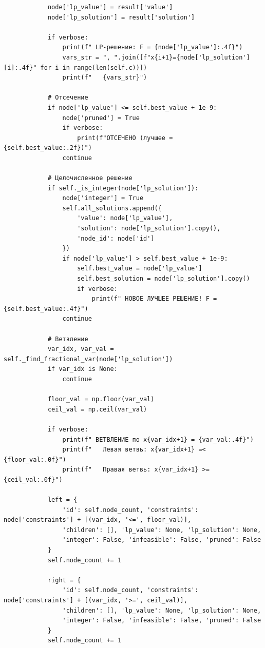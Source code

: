 \documentclass[oneside,a4paper,14pt]{extarticle}
\begin{document}
\begin{verbatim}
            node['lp_value'] = result['value']
            node['lp_solution'] = result['solution']

            if verbose:
                print(f" LP-решение: F = {node['lp_value']:.4f}")
                vars_str = ", ".join([f"x{i+1}={node['lp_solution'][i]:.4f}" for i in range(len(self.c))])
                print(f"   {vars_str}")

            # Отсечение
            if node['lp_value'] <= self.best_value + 1e-9:
                node['pruned'] = True
                if verbose:
                    print(f"ОТСЕЧЕНО (лучшее = {self.best_value:.2f})")
                continue

            # Целочисленное решение
            if self._is_integer(node['lp_solution']):
                node['integer'] = True
                self.all_solutions.append({
                    'value': node['lp_value'],
                    'solution': node['lp_solution'].copy(),
                    'node_id': node['id']
                })
                if node['lp_value'] > self.best_value + 1e-9:
                    self.best_value = node['lp_value']
                    self.best_solution = node['lp_solution'].copy()
                    if verbose:
                        print(f" НОВОЕ ЛУЧШЕЕ РЕШЕНИЕ! F = {self.best_value:.4f}")
                continue

            # Ветвление
            var_idx, var_val = self._find_fractional_var(node['lp_solution'])
            if var_idx is None:
                continue

            floor_val = np.floor(var_val)
            ceil_val = np.ceil(var_val)

            if verbose:
                print(f" ВЕТВЛЕНИЕ по x{var_idx+1} = {var_val:.4f}")
                print(f"   Левая ветвь: x{var_idx+1} =< {floor_val:.0f}")
                print(f"   Правая ветвь: x{var_idx+1} >= {ceil_val:.0f}")

            left = {
                'id': self.node_count, 'constraints': node['constraints'] + [(var_idx, '<=', floor_val)],
                'children': [], 'lp_value': None, 'lp_solution': None,
                'integer': False, 'infeasible': False, 'pruned': False
            }
            self.node_count += 1

            right = {
                'id': self.node_count, 'constraints': node['constraints'] + [(var_idx, '>=', ceil_val)],
                'children': [], 'lp_value': None, 'lp_solution': None,
                'integer': False, 'infeasible': False, 'pruned': False
            }
            self.node_count += 1


\end{verbatim}
\end{document}
